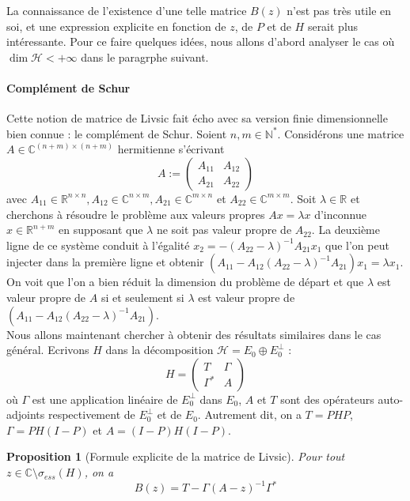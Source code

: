 \documentclass[12pt,openany,a4paper, titlepage]{article}
\newcommand{\R}{\mathbb{R}}
\newcommand{\C}{\mathbb{C}}
\newcommand{\N}{\mathbb{N}}
\newcommand{\HH}{\mathcal{H}}
\newtheorem{prop}{Proposition}
\theoremstyle{definition}
\theoremstyle{definition}
\theoremstyle{definition}
\theoremstyle{definition}
\theoremstyle{definition}
\theoremstyle{definition}
\begin{document}
La connaissance de l'existence d'une telle matrice $B(z)$ n'est pas très utile en soi, et une expression explicite en fonction de $z$, de $P$ et de $H$ serait plus intéressante. Pour ce faire quelques idées, nous allons d'abord analyser le cas où $\dim \HH < +\infty$ dans le paragrphe suivant. 

\paragraph{Complément de Schur}
Cette notion de matrice de Livsic fait écho avec sa version finie dimensionnelle bien connue : le complément de Schur.  
Soient $n,m \in\N^*$. Considérons une matrice $A\in\C^{(n+m)\times (n+m)}$ hermitienne s'écrivant 
\begin{equation*}
    A:= \begin{pmatrix}
A_{11} & A_{12} \\
A_{21} & A_{22} 
\end{pmatrix}
\end{equation*}
avec $A_{11}\in\R^{n\times n},  A_{12}\in\C^{n\times m}, A_{21}\in\C^{m\times n}$ et $A_{22}\in\C^{m\times m}$. Soit $\lambda \in \R$ et cherchons à résoudre le problème aux valeurs propres $Ax = \lambda x$ d'inconnue $x\in\R^{n+m}$ en supposant que $\lambda$ ne soit pas valeur propre de $A_{22}$. La deuxième ligne de ce système conduit à l'égalité $x_2 = -(A_{22}-\lambda)^{-1}A_{21}x_1$ que l'on peut injecter dans la première ligne et obtenir $(A_{11} - A_{12}(A_{22}-\lambda)^{-1}A_{21})x_1 = \lambda x_1 $. On voit que l'on a bien réduit la dimension du problème de départ et que $\lambda$ est valeur propre de $A$ si et seulement si $\lambda$ est valeur propre de $(A_{11} - A_{12}(A_{22}-\lambda)^{-1}A_{21})$.\\

Nous allons maintenant chercher à obtenir des résultats similaires dans le cas général. Ecrivons $H$ dans la décomposition $\HH = E_0 \oplus E_0^\perp$ :
\begin{equation}
    H = \begin{pmatrix}
        T & \Gamma \\
        \Gamma^* & A 
\end{pmatrix}
\end{equation}
où $\Gamma$ est une application linéaire de $E_0^\perp$ dans $E_0$, $A$ et $T$ sont des opérateurs auto-adjoints respectivement de $E_0^\perp$ et de $E_0$. Autrement dit, on a $T = PHP$, $\Gamma = PH(I-P)$ et $A = (I-P)H(I-P)$.

\begin{prop}[Formule explicite de la matrice de Livsic]
Pour tout $z\in\C\setminus\sigma_{ess}(H)$, on a 
\begin{equation}
    B(z) = T - \Gamma(A -z)^{-1}\Gamma^*
\end{equation}
\end{prop}
\end{document}
